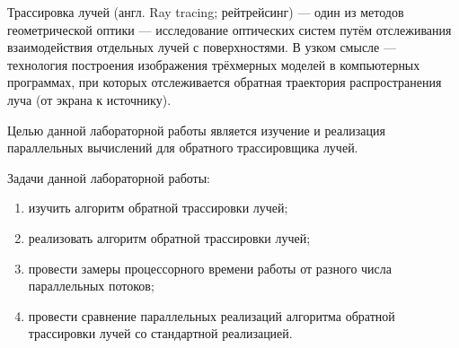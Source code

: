 \Introduction    
Трассировка лучей (англ. Ray tracing; рейтрейсинг) — один из методов геометрической оптики — исследование оптических систем путём отслеживания взаимодействия отдельных лучей с поверхностями. В узком смысле — технология построения изображения трёхмерных моделей в компьютерных программах, при которых отслеживается обратная траектория распространения луча (от экрана к источнику).

    Целью данной лабораторной работы является изучение и реализация параллельных вычислений
    для обратного трассировщика лучей.

    Задачи данной лабораторной работы:
    \begin{enumerate}
        \item изучить алгоритм обратной трассировки лучей;
        \item реализовать алгоритм обратной трассировки лучей;
        \item провести замеры процессорного времени работы от разного числа параллельных потоков;
        \item провести сравнение параллельных реализаций алгоритма обратной трассировки лучей со стандартной реализацией.
    \end{enumerate}

\newpage